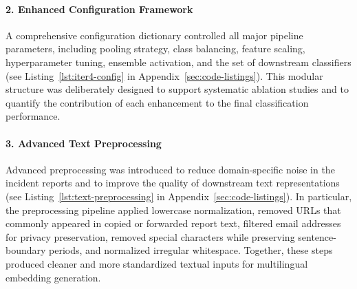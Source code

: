 \documentclass[11pt, titlepage, bibliography=totoc]{scrreprt}
\begin{document}
\paragraph{2. Enhanced Configuration Framework}
A comprehensive configuration dictionary controlled all major pipeline parameters, including pooling strategy, class balancing, feature scaling, hyperparameter tuning, ensemble activation, and the set of downstream classifiers (see Listing~\ref{lst:iter4-config} in Appendix~\ref{sec:code-listings}). This modular structure was deliberately designed to support systematic ablation studies and to quantify the contribution of each enhancement to the final classification performance.

\paragraph{3. Advanced Text Preprocessing}
Advanced preprocessing was introduced to reduce domain-specific noise in the incident reports and to improve the quality of downstream text representations (see Listing~\ref{lst:text-preprocessing} in Appendix~\ref{sec:code-listings}). In particular, the preprocessing pipeline applied lowercase normalization, removed URLs that commonly appeared in copied or forwarded report text, filtered email addresses for privacy preservation, removed special characters while preserving sentence-boundary periods, and normalized irregular whitespace. Together, these steps produced cleaner and more standardized textual inputs for multilingual embedding generation.
\end{document}
